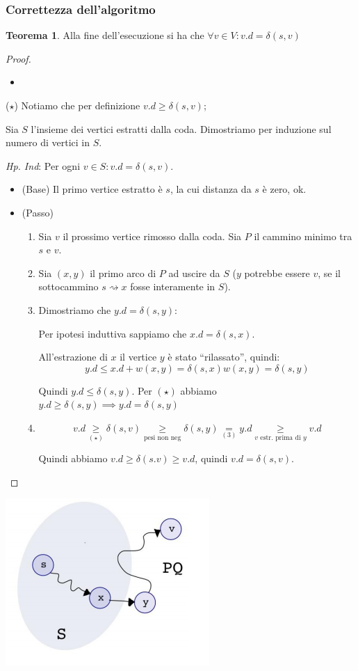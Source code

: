 \documentclass[a4paper,10pt]{article}
\theoremstyle{definition}
\newtheorem{teo}[deff]{Teorema}
\begin{document}
\subsubsection{Correttezza dell'algoritmo}
\begin{teo}
Alla fine dell'esecuzione si ha che $\forall v \in V : v.d = \delta(s, v)$ 
\end{teo}
\begin{proof}\begin{itemize}\item[]
             \end{itemize}
\bigskip
($\star$) Notiamo che per definizione $v.d \geq \delta(s, v)$;\bigskip


Sia $S$ l'insieme dei vertici estratti dalla coda. Dimostriamo per induzione sul numero di vertici in $S$.\smallskip

\emph{Hp. Ind}: Per ogni $v \in S : v.d = \delta(s, v)$.

\begin{itemize}
 \item (Base) Il primo vertice estratto è $s$, la cui distanza da $s$ è zero, ok.
 \item (Passo)
 \begin{enumerate}
  \item 
 Sia $v$ il prossimo vertice rimosso dalla coda. Sia $P$ il cammino minimo tra $s$ e $v$.
 \item Sia $(x, y)$ il primo arco di $P$ ad uscire da $S$ ($y$ potrebbe essere $v$, se il sottocammino $s \rightsquigarrow x$ fosse interamente in $S$).
 \item Dimostriamo che $y.d = \delta(s, y)$:
 
 Per ipotesi induttiva sappiamo che $x.d = \delta(s, x)$. 
 
 All'estrazione di $x$ il vertice $y$ è stato ``rilassato'', quindi: \[y.d \leq x.d + w(x, y) = \delta(s, x) w(x, y) = \delta(s, y)\]
 
 Quindi $y.d \leq \delta(s, y)$. Per $(\star)$ abbiamo $y.d \geq \delta(s, y) \implies y.d = \delta(s, y)$
 \item \[v.d \underset{(\star)}{\geq} \delta(s, v) \underset{\text{pesi non neg}}{\geq} \delta(s, y) \underset{(3)}{=} y.d \underset{\text{$v$ estr. prima di $y$}}{\geq} v.d\]
 
 Quindi abbiamo $v.d \geq \delta(s.v)\geq v.d$, quindi $v.d = \delta(s, v)$.
 \end{enumerate}

 
\end{itemize}

\end{proof}\begin{center}
                
\includegraphics[scale=.7]{dim}
           \end{center}
\end{document}
